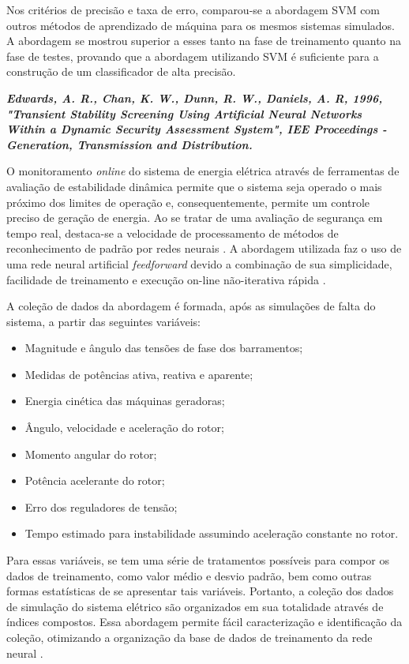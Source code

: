 \documentclass[12pt,oneside,a4paper,chapter=TITLE,section=TITLE,sumario=tradicional,english,brazil]{abntex2}
\begin{document}
	Nos critérios de precisão e taxa de erro, comparou-se a abordagem SVM com outros métodos de aprendizado de máquina para os mesmos sistemas simulados. A abordagem se mostrou superior a esses tanto na fase de treinamento quanto na fase de testes, provando que a abordagem utilizando SVM  é suficiente para a construção de um classificador de alta precisão.\par 
	
	
\textit{\textbf{Edwards, A. R., Chan, K. W., Dunn, R. W., Daniels, A. R, 1996, "Transient Stability Screening Using Artificial Neural Networks Within a Dynamic Security Assessment System", IEE Proceedings - Generation, Transmission and Distribution.}}\par
	O monitoramento \textit{online} do sistema de energia elétrica através de ferramentas de avaliação de estabilidade dinâmica permite que o sistema seja operado o mais próximo dos limites de operação e, consequentemente, permite um controle preciso de geração de energia. Ao se tratar de uma avaliação de segurança em tempo real, destaca-se a velocidade de processamento de métodos de reconhecimento de padrão por redes neurais \cite{xianlin1993}\cite{chan1995}. A abordagem utilizada faz o uso de uma rede neural artificial \textit{feedforward} devido a combinação de sua simplicidade, facilidade de
treinamento e execução on-line não-iterativa rápida \cite{haykin2009}.\par 
	A coleção de dados da abordagem é formada, após as simulações de falta do sistema, a partir das seguintes variáveis:
	\begin{itemize}
	\item Magnitude e ângulo das tensões de fase dos barramentos;
	\item Medidas de potências ativa, reativa e aparente;
	\item Energia cinética das máquinas geradoras;
	\item Ângulo, velocidade e aceleração do rotor;
	\item Momento angular do rotor;
	\item Potência acelerante do rotor;
	\item Erro dos reguladores de tensão;
	\item Tempo estimado para instabilidade assumindo aceleração constante no rotor.
	\end{itemize}
	\par
	Para essas variáveis, se tem uma série de tratamentos possíveis para compor os dados de treinamento, como valor médio e desvio padrão, bem como outras formas estatísticas de se apresentar tais variáveis. Portanto, a coleção dos dados de simulação do sistema elétrico são organizados em sua totalidade através de índices compostos. Essa abordagem permite fácil caracterização e identificação da coleção, otimizando a organização da base de dados de treinamento da rede neural  \cite{pereira2006}. \par
\end{document}
